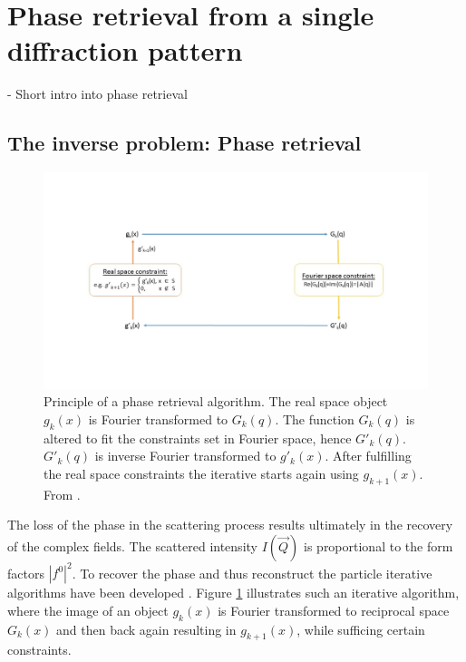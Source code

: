 \section{Phase retrieval from a single diffraction pattern}\label{sec:phase-retrieval}
- Short intro into phase retrieval
\subsection{The inverse problem: Phase retrieval}
\begin{figure}
	\centering
		\includegraphics[width=1.00\textwidth]{images/phase-retrieval-algorithm.jpg}
	\caption[Example of a phase retrieval algorithm.]{Principle of a phase retrieval algorithm. The real space object $g_{k}\left(x\right)$ is Fourier transformed to $G_{k}\left(q\right)$. The function $G_{k}\left(q\right)$ is altered to fit the constraints set in Fourier space, hence $G'_{k}\left(q\right)$. $G'_{k}\left(q\right)$ is inverse Fourier transformed to $g'_{k}\left(x\right)$. After fulfilling the real space constraints the iterative starts again using $g_{k+1}\left(x\right)$. From \citep{Fienup-1982-AO}.}
	\label{fig:phase-retrieval-algorithm}
\end{figure}
The loss of the phase in the scattering process results ultimately in the recovery of the complex fields. The scattered intensity $I\left(\vec{Q}\right)$ is proportional to the form factors $\left|f^{0}\right|^{2}$. To recover the phase and thus reconstruct the particle iterative algorithms have been developed \cite{Fienup-1982-AO}. Figure \ref{fig:phase-retrieval-algorithm} illustrates such an iterative algorithm, where the image of an object $g_{k}\left(x\right)$ is Fourier transformed to reciprocal space $G_{k}\left(x\right)$ and then back again resulting in $g_{k+1}(x)$, while sufficing certain constraints.\\
